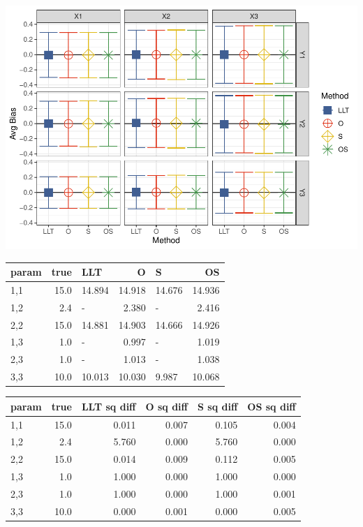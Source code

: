 \documentclass[
]{article}
\begin{document}
\includegraphics{FullSimulation_files/figure-latex/unnamed-chunk-9-1.pdf}

\begin{longtable}[t]{l|r|l|r|l|r}
\hline
param & true & LLT & O & S & OS\\
\hline
1,1 & 15.0 & 14.894 & 14.918 & 14.676 & 14.936\\
\hline
1,2 & 2.4 & - & 2.380 & - & 2.416\\
\hline
2,2 & 15.0 & 14.881 & 14.903 & 14.666 & 14.926\\
\hline
1,3 & 1.0 & - & 0.997 & - & 1.019\\
\hline
2,3 & 1.0 & - & 1.013 & - & 1.038\\
\hline
3,3 & 10.0 & 10.013 & 10.030 & 9.987 & 10.068\\
\hline
\end{longtable}

\begin{longtable}[t]{l|r|r|r|r|r}
\hline
param & true & LLT sq diff & O sq diff & S sq diff & OS sq diff\\
\hline
1,1 & 15.0 & 0.011 & 0.007 & 0.105 & 0.004\\
\hline
1,2 & 2.4 & 5.760 & 0.000 & 5.760 & 0.000\\
\hline
2,2 & 15.0 & 0.014 & 0.009 & 0.112 & 0.005\\
\hline
1,3 & 1.0 & 1.000 & 0.000 & 1.000 & 0.000\\
\hline
2,3 & 1.0 & 1.000 & 0.000 & 1.000 & 0.001\\
\hline
3,3 & 10.0 & 0.000 & 0.001 & 0.000 & 0.005\\
\hline
\end{longtable}
\end{document}
